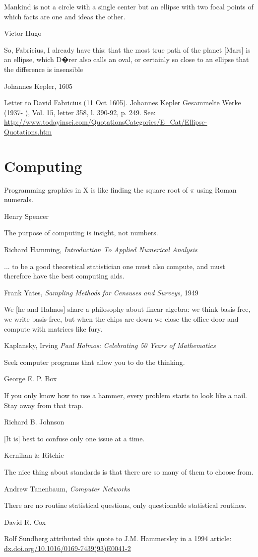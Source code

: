 \epigraph{Mankind is not a circle with a single center but an ellipse with two focal points of which facts are one and ideas the other.}{Victor Hugo}

\epigraph{So, Fabricius, I already have this: that the most true path of the planet [Mars] is an ellipse, which D�rer also calls an oval, or certainly so close to an ellipse that the difference is insensible}{Johannes Kepler, 1605}

Letter to David Fabricius (11 Oct 1605). Johannes Kepler Gesammelte Werke (1937- ), Vol. 15, letter 358, l. 390-92, p. 249.
See: \url{http://www.todayinsci.com/QuotationsCategories/E_Cat/Ellipse-Quotations.htm}


\section{Computing}

\epigraph{Programming graphics in X is like finding the square root of $\pi$ using Roman numerals.}{Henry Spencer}

\epigraph{The purpose of computing is insight, not numbers.}{Richard Hamming, \emph{Introduction To Applied Numerical Analysis}}

\epigraph{... to be a good theoretical statistician one must also compute, and must therefore have the best computing aids.}{Frank Yates, \emph{Sampling Methods for Censuses and Surveys}, 1949}

\epigraph{We [he and Halmos] share a philosophy about linear algebra: we think basis-free, we write basis-free, but when the chips are down we close the office door and compute with matrices like fury.}{Kaplansky, Irving \emph{Paul Halmos: Celebrating 50 Years of Mathematics}}

\epigraph{Seek computer programs that allow you to do the thinking.}{George E. P. Box}

\epigraph{If you only know how to use a hammer, every problem starts to look like a nail.  Stay away from that trap.}{Richard B. Johnson}

\epigraph{[It is] best to confuse only one issue at a time.}{Kernihan \& Ritchie}

\epigraph{The nice thing about standards is that there are so many of them to choose from.}{Andrew Tanenbaum, \emph{Computer Networks}}

\epigraph{There are no routine statistical questions, only questionable statistical routines.}{David R. Cox}
Rolf Sundberg attributed this quote to J.M. Hammersley in a 1994 article: \url{dx.doi.org/10.1016/0169-7439(93)E0041-2}

